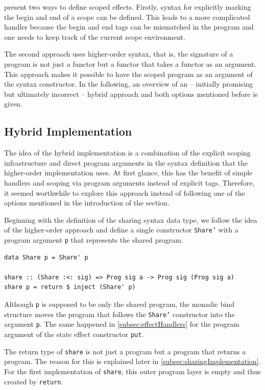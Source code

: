 \documentclass[a4paper, 11pt, fleqn, twoside, abstract=on]{scrreprt}
\newcommand{\hinl}[1]{\texttt{#1}}
\begin{document}
\citet{wu2014effect} present two ways to define scoped effects.
Firstly, syntax for explicitly marking the begin and end of a scope can be defined.
This leads to a more complicated handler because the begin and end tags can be mismatched in the program and one needs to keep track of the current scope environment.

The second approach uses higher-order syntax, that is, the signature of a program is not just a functor but a functor that takes a functor as an argument.
This approach makes it possible to have the scoped program as an argument of the syntax constructor.
In the following, an overview of an  -- initially promising but ultimately incorrect  -- hybrid approach and both options mentioned before is given.

\subsection{Hybrid Implementation}

The idea of the hybrid implementation is a combination of the explicit scoping infrastructure and direct program arguments in the syntax definition that the higher-order implementation uses.
At first glance, this has the benefit of simple handlers and scoping via program arguments instead of explicit tags.
Therefore, it seemed worthwhile to explore this approach instead of following one of the options mentioned in the introduction of the section.

Beginning with the definition of the sharing syntax data type, we follow the idea of the higher-order approach and define a single constructor \hinl{Share'} with a program argument \hinl{p} that represents the shared program.

\begin{verbatim}
data Share p = Share' p

share :: (Share :<: sig) => Prog sig a -> Prog sig (Prog sig a)
share p = return $ inject (Share' p)
\end{verbatim}
Although \hinl{p} is supposed to be only the shared program, the monadic bind structure moves the program that follows the \hinl{Share'} constructor into the argument \hinl{p}.
The same happened in \autoref{subsec:effectHandlers} for the program argument of the state effect constructor \hinl{put}.

The return type of \hinl{share} is not just a program but a program that returns a program.
The reason for this is explained later in \autoref{subsec:sharingImplementation}.
For the first implementation of \hinl{share}, this outer program layer is empty and thus created by \hinl{return}.
\end{document}
